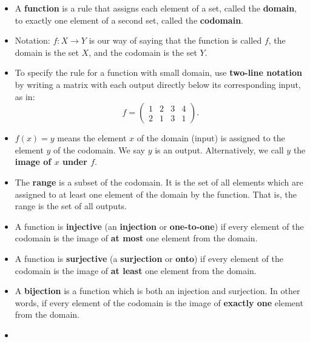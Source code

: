 \documentclass[10pt,]{book}
\newcommand{\terminology}[1]{\textbf{#1}}
\theoremstyle{plain}
\theoremstyle{definition}
\theoremstyle{definition}
\theoremstyle{definition}
\theoremstyle{definition}
\numberwithin{equation}{chapter}
\newcommand{\amp}{&}
\begin{document}
\begin{assemblage}\label{assemblage-28}
\hypertarget{p-1665}{}%
%
\begin{itemize}[label=\textbullet]
\item{}\hypertarget{p-1666}{}%
A \terminology{function} is a rule that assigns each element of a set, called the \terminology{domain}, to exactly one element of a second set, called the \terminology{codomain}.%
\item{}\hypertarget{p-1667}{}%
Notation: \(f:X \to Y\) is our way of saying that the function is called \(f\), the domain is the set \(X\), and the codomain is the set \(Y\).%
\item{}\hypertarget{p-1668}{}%
To specify the rule for a function with small domain, use \terminology{two-line notation} by writing a matrix with each output directly below its corresponding input, as in:%
\begin{equation*}
f = \begin{pmatrix}1 \amp 2 \amp 3 \amp 4 \\ 2 \amp 1 \amp 3 \amp 1 \end{pmatrix}.
\end{equation*}
%
\item{}\hypertarget{p-1669}{}%
\(f(x) = y\) means the element \(x\) of the domain (input) is assigned to the element \(y\) of the codomain. We say \(y\) is an output. Alternatively, we call \(y\) the \terminology{image of \(x\) under \(f\)}.%
\item{}\hypertarget{p-1670}{}%
The \terminology{range} is a subset of the codomain. It is the set of all elements which are assigned to at least one element of the domain by the function. That is, the range is the set of all outputs.%
\item{}\hypertarget{p-1671}{}%
A function is \terminology{injective} (an \terminology{injection} or \terminology{one-to-one}) if every element of the codomain is the image of \terminology{at most} one element from the domain.%
\item{}\hypertarget{p-1672}{}%
A function is \terminology{surjective} (a \terminology{surjection} or \terminology{onto}) if every element of the codomain is the image of \terminology{at least} one element from the domain.%
\item{}\hypertarget{p-1673}{}%
A \terminology{bijection} is a function which is both an injection and surjection. In other words, if every element of the codomain is the image of \terminology{exactly one} element from the domain.%
\item{}\hypertarget{p-1674}{}%

\end{itemize}
\end{assemblage}
\end{document}

